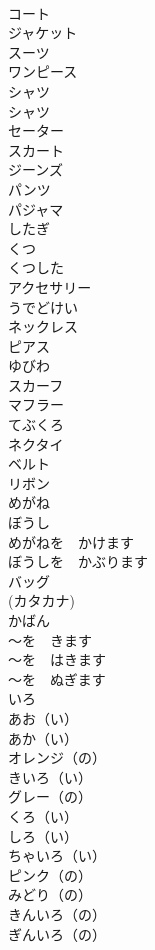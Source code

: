 \documentclass[8pt]{extreport}
\begin{document}
\begin{CJK}{UTF8}{min}
\\	コート	
\\	ジャケット	
\\	スーツ	
\\	ワンピース	
\\	シャツ	
\\	シャツ	
\\	セーター	
\\	スカート	
\\	ジーンズ	
\\	パンツ	
\\	パジャマ	
\\	したぎ	
\\	くつ	
\\	くつした	
\\	アクセサリー	
\\	うでどけい	
\\	ネックレス	
\\	ピアス	
\\	ゆびわ	
\\	スカーフ	
\\	マフラー	
\\	てぶくろ	
\\	ネクタイ	
\\	ベルト	
\\	リボン	
\\	めがね	
\\	ぼうし	
\\	めがねを　かけます	
\\	ぼうしを　かぶります	
\\	バッグ	
\\	(カタカナ)
\\	かばん	
\\	～を　きます	
\\	～を　はきます	
\\	～を　ぬぎます	
\\	いろ	
\\	あお（い）	
\\	あか（い）	
\\	オレンジ（の）	
\\	きいろ（い）	
\\	グレー（の）	
\\	くろ（い）	
\\	しろ（い）	
\\	ちゃいろ（い）	
\\	ピンク（の）	
\\	みどり（の）	
\\	きんいろ（の）	
\\	ぎんいろ（の）	

\end{CJK}
\end{document}
